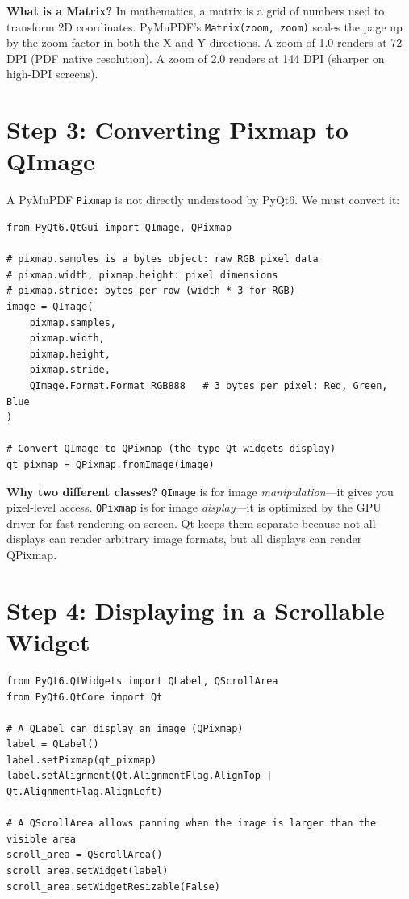 \documentclass[12pt,oneside]{book}
\begin{document}
\begin{notebox}
\textbf{What is a Matrix?} In mathematics, a matrix is a grid of numbers used to
transform 2D coordinates. PyMuPDF's \texttt{Matrix(zoom, zoom)} scales the page up by
the zoom factor in both the X and Y directions. A zoom of 1.0 renders at 72 DPI (PDF
native resolution). A zoom of 2.0 renders at 144 DPI (sharper on high-DPI screens).
\end{notebox}

\section{Step 3: Converting Pixmap to QImage}

A PyMuPDF \texttt{Pixmap} is not directly understood by PyQt6. We must convert it:

\begin{lstlisting}[caption={Converting fitz.Pixmap to QImage (LLR-05)}]
from PyQt6.QtGui import QImage, QPixmap

# pixmap.samples is a bytes object: raw RGB pixel data
# pixmap.width, pixmap.height: pixel dimensions
# pixmap.stride: bytes per row (width * 3 for RGB)
image = QImage(
    pixmap.samples,
    pixmap.width,
    pixmap.height,
    pixmap.stride,
    QImage.Format.Format_RGB888   # 3 bytes per pixel: Red, Green, Blue
)

# Convert QImage to QPixmap (the type Qt widgets display)
qt_pixmap = QPixmap.fromImage(image)
\end{lstlisting}

\begin{notebox}
\textbf{Why two different classes?} \texttt{QImage} is for image \textit{manipulation}—it
gives you pixel-level access. \texttt{QPixmap} is for image \textit{display}—it is
optimized by the GPU driver for fast rendering on screen. Qt keeps them separate because
not all displays can render arbitrary image formats, but all displays can render QPixmap.
\end{notebox}

\section{Step 4: Displaying in a Scrollable Widget}

\begin{lstlisting}[caption={Displaying QPixmap in a scroll area (LLR-06)}]
from PyQt6.QtWidgets import QLabel, QScrollArea
from PyQt6.QtCore import Qt

# A QLabel can display an image (QPixmap)
label = QLabel()
label.setPixmap(qt_pixmap)
label.setAlignment(Qt.AlignmentFlag.AlignTop | Qt.AlignmentFlag.AlignLeft)

# A QScrollArea allows panning when the image is larger than the visible area
scroll_area = QScrollArea()
scroll_area.setWidget(label)
scroll_area.setWidgetResizable(False)
\end{lstlisting}
\end{document}
